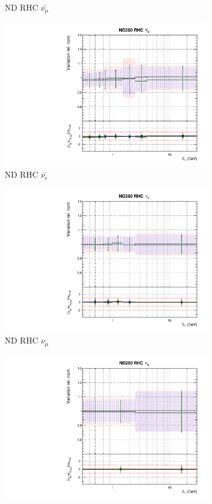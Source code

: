 \begin{figure}
\begin{subfigure}{0.24\textwidth}
  \caption{ND RHC $\bar{\nu_{\mu}}$}
\end{subfigure}
\begin{subfigure}{0.24\textwidth}
  \centering
  \includegraphics[width=0.95\linewidth]{figs/polyasmvsflux_5}
  \caption{ND RHC $\bar{\nu_{e}}$}
\end{subfigure}
\begin{subfigure}{0.24\textwidth}
  \centering
  \includegraphics[width=0.95\linewidth]{figs/polyasmvsflux_6}
  \caption{ND RHC $\nu_{\mu}$}
\end{subfigure}
\vspace{15mm}
\begin{subfigure}{0.24\textwidth}
  \centering
  \includegraphics[width=0.95\linewidth]{figs/polyasmvsflux_7}

\end{subfigure}
\end{figure}
